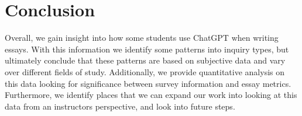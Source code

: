 \documentclass[manuscript,screen,acmsmall]{acmart}
\begin{document}
    
    \section{Conclusion} 

    Overall, we gain insight into how some students use ChatGPT when writing essays. With this information we identify some patterns into inquiry types, but ultimately conclude that these patterns are based on subjective data and vary over different fields of study. Additionally, we provide quantitative analysis on this data looking for significance between survey information and essay metrics. Furthermore, we identify places that we can expand our work into looking at this data from an instructors perspective, and look into future steps.







\begin{acks}

\end{acks}




\end{document}
